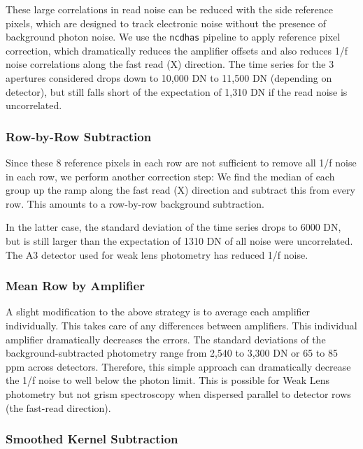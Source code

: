 \documentclass[]{aastex62}
\begin{document}
These large correlations in read noise can be reduced with the side reference pixels, which are designed to track electronic noise without the presence of background photon noise.
We use the \texttt{ncdhas} pipeline to apply reference pixel correction, which dramatically reduces the amplifier offsets and also reduces 1/f noise correlations along the fast read (X) direction.
The time series for the 3 apertures considered drops down to 10,000 DN to 11,500 DN (depending on detector), but still falls short of the expectation of 1,310 DN if the read noise is uncorrelated.

\subsubsection{Row-by-Row Subtraction}\label{sec:photRowByRow}

Since these 8 reference pixels in each row are not sufficient to remove all 1/f noise in each row, we perform another correction step:
We find the median of each group up the ramp along the fast read (X) direction and subtract this from every row.
This amounts to a row-by-row background subtraction.

In the latter case, the standard deviation of the time series drops to 6000 DN, but is still larger than the expectation of 1310 DN of all noise were uncorrelated.
The A3 detector used for weak lens photometry has reduced 1/f noise.

\subsubsection{Mean Row by Amplifier}\label{sec:indAmpAvg}
A slight modification to the above strategy is to average each amplifier individually.
This takes care of any differences between amplifiers.
This individual amplifier dramatically decreases the errors.
The standard deviations of the background-subtracted photometry range from 2,540 to 3,300 DN or 65 to 85 ppm across detectors.
Therefore, this simple approach can dramatically decrease the 1/f noise to well below the photon limit.
This is possible for Weak Lens photometry but not grism spectroscopy when dispersed parallel to detector rows (the fast-read direction).

\subsubsection{Smoothed Kernel Subtraction}\label{sec:smoothKernelSub}
\end{document}
